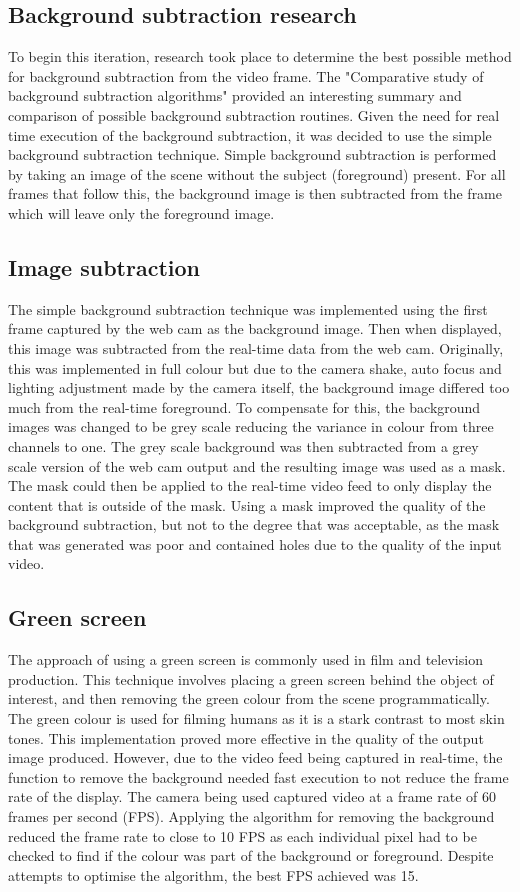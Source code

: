 \subsection{Background subtraction research}
To begin this iteration, research took place to determine the best possible method for background subtraction from the video frame. The "Comparative study of background subtraction algorithms" \cite{background_subtraction_comparison} provided an interesting summary and comparison of possible background subtraction routines. Given the need for real time execution of the background subtraction, it was decided to use the simple background subtraction technique. Simple background subtraction is performed by taking an image of the scene without the subject (foreground) present. For all frames that follow this, the background image is then subtracted from the frame which will leave only the foreground image.

\subsection{Image subtraction}
The simple background subtraction technique was implemented using the first frame captured by the web cam as the background image. Then when displayed, this image was subtracted from the real-time data from the web cam. Originally, this was implemented in full colour but due to the camera shake, auto focus and lighting adjustment made by the camera itself, the background image differed too much from the real-time foreground. To compensate for this, the background images was changed to be grey scale reducing the variance in colour from three channels to one. The grey scale background was then subtracted from a grey scale version of the web cam output and the resulting image was used as a mask. The mask could then be applied to the real-time video feed to only display the content that is outside of the mask. Using a mask improved the quality of the background subtraction, but not to the degree that was acceptable, as the mask that was generated was poor and contained holes due to the quality of the input video.

\subsection{Green screen}
The approach of using a green screen is commonly used in film and television production. This technique involves placing a green screen behind the object of interest, and then removing the green colour from the scene programmatically. The green colour is used for filming humans as it is a stark contrast to most skin tones. This implementation proved more effective in the quality of the output image produced. However, due to the video feed being captured in real-time, the function to remove the background needed fast execution to not reduce the frame rate of the display. The camera being used captured video at a frame rate of 60 frames per second (FPS). Applying the algorithm for removing the background reduced the frame rate to close to 10 FPS as each individual pixel had to be checked to find if the colour was part of the background or foreground. Despite attempts to optimise the algorithm, the best FPS achieved was 15.

